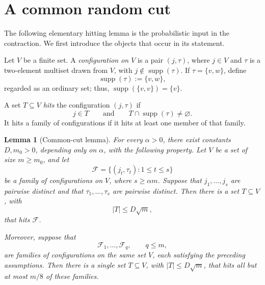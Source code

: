 \documentclass[10pt]{article}
\newtheorem{lemma}[theorem]{Lemma}
\theoremstyle{definition}
\begin{document}
\section{A common random cut}

The following elementary hitting lemma is the probabilistic input in the
contraction.  We first introduce the objects that occur in its statement.

Let $V$ be a finite set.  A \emph{configuration on $V$} is a pair
$(j,\tau)$, where $j\in V$ and $\tau$ is a two-element multiset drawn from
$V$, with $j\notin\operatorname{supp}(\tau)$.  If $\tau=\{v,w\}$, define
\[
    \operatorname{supp}(\tau):=\{v,w\},
\]
regarded as an ordinary set; thus,
$\operatorname{supp}(\{v,v\})=\{v\}$.

A set $T\subseteq V$ \emph{hits} the configuration $(j,\tau)$ if
\[
    j\in T
    \qquad\text{and}\qquad
    T\cap\operatorname{supp}(\tau)\ne\varnothing.
\]
It hits a family of configurations if it hits at least one member of that
family.

\begin{lemma}[Common-cut lemma]
For every $\alpha>0$, there exist constants $D,m_0>0$, depending only on
$\alpha$, with the following property.  Let $V$ be a set of size
$m\ge m_0$, and let
\[
    \mathcal F=\{(j_t,\tau_t):1\le t\le s\}
\]
be a family of configurations on $V$, where $s\ge\alpha m$.  Suppose that
$j_1,\ldots,j_s$ are pairwise distinct and that
$\tau_1,\ldots,\tau_s$ are pairwise distinct.  Then there is a set
$T\subseteq V$, with
\[
    |T|\le D\sqrt m,
\]
that hits $\mathcal F$.

Moreover, suppose that
\[
    \mathcal F_1,\ldots,\mathcal F_q,
    \qquad q\le m,
\]
are families of configurations on the same set $V$, each satisfying the
preceding assumptions.  Then there is a single set $T\subseteq V$, with
$|T|\le D\sqrt m$, that hits all but at most $m/8$ of these families.
\end{lemma}
\end{document}
